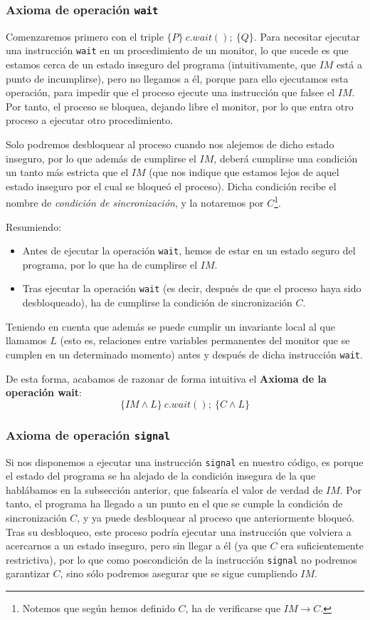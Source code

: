 \subsubsection{Axioma de operación \texttt{wait}}
Comenzaremos primero con el triple $\{P\}\ c.wait();\ \{Q\}$. Para necesitar ejecutar una instrucción \verb|wait| en un procedimiento de un monitor, lo que sucede es que estamos cerca de un estado inseguro del programa (intuitivamente, que $IM$ está a punto de incumplirse), pero no llegamos a él, porque para ello ejecutamos esta operación, para impedir que el proceso ejecute una instrucción que falsee el $IM$. Por tanto, el proceso se bloquea, dejando libre el monitor, por lo que entra otro proceso a ejecutar otro procedimiento. 

Solo podremos desbloquear al proceso cuando nos alejemos de dicho estado inseguro, por lo que además de cumplirse el $IM$, deberá cumplirse una condición un tanto más estricta que el $IM$ (que nos indique que estamos lejos de aquel estado inseguro por el cual se bloqueó el proceso). Dicha condición recibe el nombre de \textit{condición de sincronización}, y la notaremos por $C$\footnote{Notemos que según hemos definido $C$, ha de verificarse que $IM\rightarrow C$.}. 

Resumiendo:
\begin{itemize}
    \item Antes de ejecutar la operación \verb|wait|, hemos de estar en un estado seguro del programa, por lo que ha de cumplirse el $IM$.
    \item Tras ejecutar la operación \verb|wait| (es decir, después de que el proceso haya sido desbloqueado), ha de cumplirse la condición de sincronización $C$.
\end{itemize}
Teniendo en cuenta que además se puede cumplir un invariante local al que llamamos $L$ (esto es, relaciones entre variables permanentes del monitor que se cumplen en un determinado momento) antes y después de dicha instrucción \verb|wait|.

De esta forma, acabamos de razonar de forma intuitiva el \textbf{Axioma de la operación wait}:
\begin{equation*}
    \{IM \land L\}\ c.wait();\ \{C \land L\}
\end{equation*}

\subsubsection{Axioma de operación \texttt{signal}}
Si nos disponemos a ejecutar una instrucción \verb|signal| en nuestro código, es porque el estado del programa se ha alejado de la condición insegura de la que hablábamos en la subsección anterior, que falsearía el valor de verdad de $IM$. Por tanto, el programa ha llegado a un punto en el que se cumple la condición de sincronización $C$, y ya puede desbloquear al proceso que anteriormente bloqueó. Tras su desbloqueo, este proceso podría ejecutar una instrucción que volviera a acercarnos a un estado inseguro, pero sin llegar a él (ya que $C$ era suficientemente restrictiva), por lo que como poscondición de la instrucción \verb|signal| no podremos garantizar $C$, sino sólo podremos asegurar que se sigue cumpliendo $IM$.

